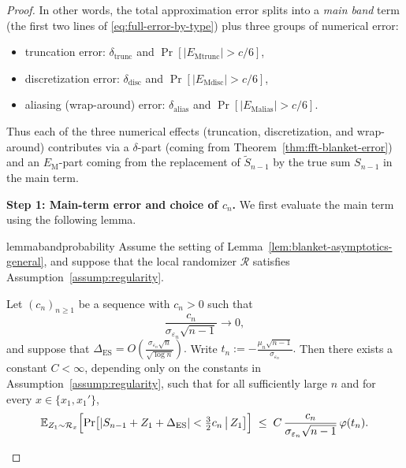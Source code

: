 \documentclass{article}
\theoremstyle{plain}
\theoremstyle{definition}
\begin{document}
\begin{proof}
In other words, the total approximation error splits into a \emph{main
band} term (the first two lines of \eqref{eq:full-error-by-type}) plus
three groups of numerical error:
\begin{itemize}
  \item truncation error:
    \(\delta_{\mathrm{trunc}}\) and
    \(\Pr[|E_{\mathrm{Mtrunc}}|>c/6]\),
  \item discretization error:
    \(\delta_{\mathrm{disc}}\) and
    \(\Pr[|E_{\mathrm{Mdisc}}|>c/6]\),
  \item aliasing (wrap-around) error:
    \(\delta_{\mathrm{alias}}\) and
    \(\Pr[|E_{\mathrm{Malias}}|>c/6]\).
\end{itemize}
Thus each of the three numerical effects (truncation, discretization,
and wrap-around) contributes via a \(\delta\)-part (coming from
Theorem~\ref{thm:fft-blanket-error}) and an \(E_{\mathrm{M}}\)-part
coming from the replacement of \(\widetilde S_{n-1}\) by the true sum
\(S_{n-1}\) in the main term.




\textbf{Step 1: Main-term error and choice of $c_n$.}
We first evaluate the main term using the following lemma.

\begin{restatable}{lemma}{bandprobability}
\label{lem:band-prob-fixed-x-bigO}
Assume the setting of Lemma~\ref{lem:blanket-asymptotics-general}, and suppose that the local
randomizer $\mathcal R$ satisfies Assumption~\ref{assump:regularity}.

Let $(c_n)_{n\ge1}$ be a sequence with $c_n>0$ such that
\[
  \frac{c_n}{\sigma_{\varepsilon_n}\sqrt{n-1}} \longrightarrow 0,
\]
and suppose that
$
  \Delta_{\mathrm{ES}}=O\left(\frac{\sigma_{\varepsilon_n}\sqrt{n}}{\sqrt{\log n}}\right).
$
Write
$
  t_n := -\frac{\mu_n\sqrt{n-1}}{\sigma_{\varepsilon_n}}.
$
Then there exists a constant $C<\infty$, depending only on the
constants in Assumption~\ref{assump:regularity}, such that for all
sufficiently large $n$ and for every $x\in\{x_1,x_1'\}$,
\begin{equation}
  \label{eq:band-prob-bigO}
  \mathbb E_{Z_1\sim\mathcal R_x}\Bigl[
    \Pr\bigl[
      |S_{n-1} + Z_1 + \Delta_{\mathrm{ES}}|
      < \tfrac{3}{2}c_n
      \,\big|\,
      Z_1
    \bigr]
  \Bigr]
  \;\le\;
  C \,\frac{c_n}{\sigma_{\varepsilon_n}\sqrt{n-1}}\,
  \varphi(t_n).
\end{equation}
\end{restatable}


\end{proof}
\end{document}
